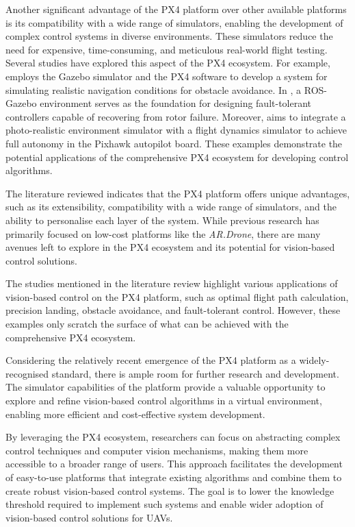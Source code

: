 Another significant advantage of the PX4 platform over other available platforms is its compatibility with a wide range of simulators, enabling the development of complex control systems in diverse environments. These simulators reduce the need for expensive, time-consuming, and meticulous real-world flight testing. Several studies have explored this aspect of the PX4 ecosystem. 
For example, \cite{garcia2022} employs the Gazebo simulator and the PX4 software to develop a system for simulating realistic navigation conditions for obstacle avoidance.
In \cite{chen2022}, a ROS-Gazebo environment serves as the foundation for designing fault-tolerant controllers capable of recovering from rotor failure. 
Moreover, \cite{huynh2022} aims to integrate a photo-realistic environment simulator with a flight dynamics simulator to achieve full autonomy in the Pixhawk autopilot board. 
These examples demonstrate the potential applications of the comprehensive PX4 ecosystem for developing control algorithms.


The literature reviewed indicates that the PX4 platform offers unique advantages, such as its extensibility, compatibility with a wide range of simulators, and the ability to personalise each layer of the system. While previous research has primarily focused on low-cost platforms like the \emph{AR.Drone}, there are many avenues left to explore in the PX4 ecosystem and its potential for vision-based control solutions.

The studies mentioned in the literature review highlight various applications of vision-based control on the PX4 platform, such as optimal flight path calculation, precision landing, obstacle avoidance, and fault-tolerant control. However, these examples only scratch the surface of what can be achieved with the comprehensive PX4 ecosystem.

Considering the relatively recent emergence of the PX4 platform as a widely-recognised standard, there is ample room for further research and development. The simulator capabilities of the platform provide a valuable opportunity to explore and refine vision-based control algorithms in a virtual environment, enabling more efficient and cost-effective system development.

By leveraging the PX4 ecosystem, researchers can focus on abstracting complex control techniques and computer vision mechanisms, making them more accessible to a broader range of users. This approach facilitates the development of easy-to-use platforms that integrate existing algorithms and combine them to create robust vision-based control systems. The goal is to lower the knowledge threshold required to implement such systems and enable wider adoption of vision-based control solutions for UAVs.


